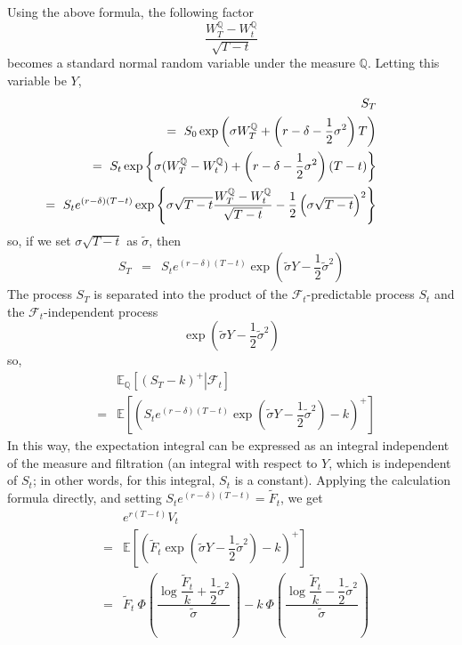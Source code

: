 \documentclass[uplatex,a4j,12pt,dvipdfmx]{jsarticle}
\begin{document}
Using the above formula, the following factor
$$
	\dfrac{W^{\mathbb{Q}}_{T} - W^{\mathbb{Q}}_{t}}{\sqrt{T-t}}
$$
becomes a standard normal random variable under the measure $\mathbb{Q}$.
Letting this variable be $Y$,
%
%
\begin{eqnarray*}
	&&
	S_{T}
	\\ && \hspace{-15mm} = \
	S_{0}
	\exp
	\left(
	\sigma W^{\mathbb{Q}}_{T}
	+
	\left(
	r
	- \delta
	- \dfrac{1}{2} \sigma^{2}
	\right)
	T
	\right)
	\\ && \hspace{-15mm} = \
	S_{t}
	\exp
	\left\{
	\sigma ( W^{\mathbb{Q}}_{T} - W^{\mathbb{Q}}_{t} )
	+
	\left(
	r
	- \delta
	- \dfrac{1}{2} \sigma^{2}
	\right)
	(T-t)
	\right\}
	\\ && \hspace{-15mm} = \
	S_{t}
	e^{(r - \delta )(T-t)}
	\exp
	\left\{
	\sigma \sqrt{T-t}
	\dfrac{ W^{\mathbb{Q}}_{T} - W^{\mathbb{Q}}_{t} }
	{\sqrt{T-t}}
	-
	\dfrac{1}{2}
	\left( \sigma \sqrt{T-t} \right)^{2}
	\right\}
\end{eqnarray*}
%
%
so, if we set $\sigma \sqrt{T-t}$ as $\tilde{\sigma}$, then
%
%
\begin{eqnarray*}
	S_{T}
	&=&
	S_{t}
	e^{(r - \delta )(T-t)}
	\exp
	\left(
	\tilde{\sigma} Y
	-
	\dfrac{1}{2}
	\tilde{\sigma}^{2}
	\right)
\end{eqnarray*}
%
%
The process $S_{T}$ is separated into the product of the $\mathcal{F}_{t}$-predictable process $S_{t}$ and the $\mathcal{F}_{t}$-independent process
$$
	\exp
	\left(
	\tilde{\sigma} Y
	-
	\dfrac{1}{2}
	\tilde{\sigma}^{2}
	\right)
$$
so,
%
%
\begin{eqnarray*}
	&&
	\mathbb{E}_{\mathbb{Q}} \left[ \left. \left(
		S_{T}
		-k
		\right)^{+} \right| \mathcal{F}_{t} \right]
	\\ &=&
	\mathbb{E} \left[ \left(
		S_{t}
		e^{(r - \delta )(T-t)}
		\exp
		\left(
		\tilde{\sigma} Y
		-
		\dfrac{1}{2}
		\tilde{\sigma}^{2}
		\right)
		-k
		\right)^{+} \right]
\end{eqnarray*}
%
%
In this way, the expectation integral can be expressed as an integral independent of the measure and filtration (an integral with respect to $Y$, which is independent of $S_{t}$; in other words, for this integral, $S_{t}$ is a constant).
Applying the calculation formula directly, and setting $S_{t} e^{(r - \delta)(T-t)}=\tilde{F}_{t}$, we get
%
%
\begin{eqnarray*}
	&&
	e^{r(T-t)}V_{t}
	\\ &=&
	\mathbb{E} \left[ \left(
		\tilde{F}_{t}
		\exp
		\left(
		\tilde{\sigma} Y
		-
		\dfrac{1}{2}
		\tilde{\sigma}^{2}
		\right)
		-k
		\right)^{+} \right]
	\\ &=&
	\tilde{F}_{t}
	\ \! \Phi
	\left(
	\dfrac{
		\log \dfrac{\tilde{F}_{t}}{k} + \dfrac{1}{2} \tilde{\sigma}^{2}
	}
	{\tilde{\sigma}}
	\right)
	-
	k
	\ \! \Phi
	\left(
	\dfrac{
		\log \dfrac{\tilde{F}_{t}}{k} - \dfrac{1}{2} \tilde{\sigma}^{2}
	}
	{\tilde{\sigma}}
	\right)
\end{eqnarray*}
%
%
\end{document}

